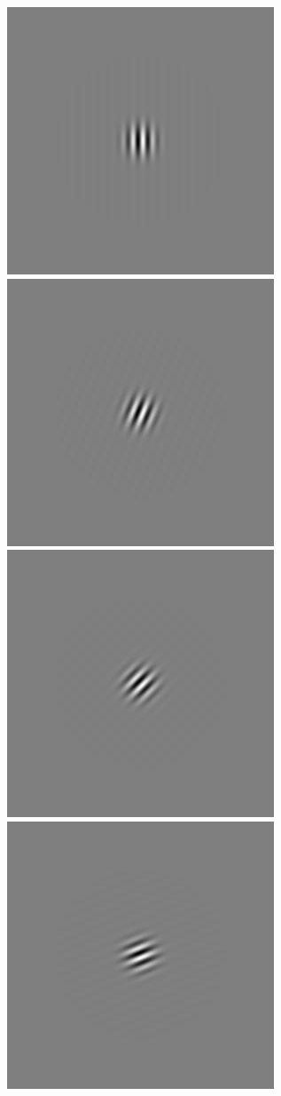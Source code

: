 \begin{figure}
\begin{center}
 \includegraphics[scale=0.1]{ch4/figures/rGabor2_0.jpg}
 \includegraphics[scale=0.1]{ch4/figures/rGabor2_1.jpg}
 \includegraphics[scale=0.1]{ch4/figures/rGabor2_2.jpg}
 \includegraphics[scale=0.1]{ch4/figures/rGabor2_3.jpg}

\end{center}
\end{figure}
